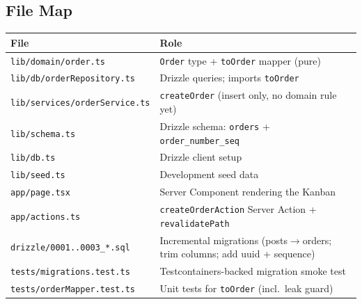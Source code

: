\documentclass[11pt]{article}
\begin{document}
\subsection{File Map}

\begin{center}
\begin{tabular}{@{}p{6cm}p{8cm}@{}}
\toprule
\textbf{File} & \textbf{Role} \\
\midrule
\texttt{lib/domain/order.ts} & \texttt{Order} type + \texttt{toOrder} mapper (pure) \\
\texttt{lib/db/orderRepository.ts} & Drizzle queries; imports \texttt{toOrder} \\
\texttt{lib/services/orderService.ts} & \texttt{createOrder} (insert only, no domain rule yet) \\
\texttt{lib/schema.ts} & Drizzle schema: \texttt{orders} + \texttt{order\_number\_seq} \\
\texttt{lib/db.ts} & Drizzle client setup \\
\texttt{lib/seed.ts} & Development seed data \\
\texttt{app/page.tsx} & Server Component rendering the Kanban \\
\texttt{app/actions.ts} & \texttt{createOrderAction} Server Action + \texttt{revalidatePath} \\
\texttt{drizzle/0001..0003\_*.sql} & Incremental migrations (posts$\to$orders; trim columns; add uuid + sequence) \\
\texttt{tests/migrations.test.ts} & Testcontainers-backed migration smoke test \\
\texttt{tests/orderMapper.test.ts} & Unit tests for \texttt{toOrder} (incl.\ leak guard) \\
\bottomrule
\end{tabular}
\end{center}
\end{document}
